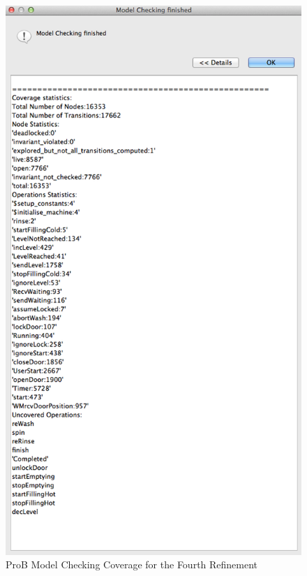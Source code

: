 \begin{figure}[!htbp]
  \includegraphics[width=1\textwidth]{figures/image48.png}
  \fi
  \caption{ProB Model Checking Coverage for the Fourth Refinement}
  \label{fig:ProBModelCheckingCoverageForTheFourthRefinement}
\end{figure}  


